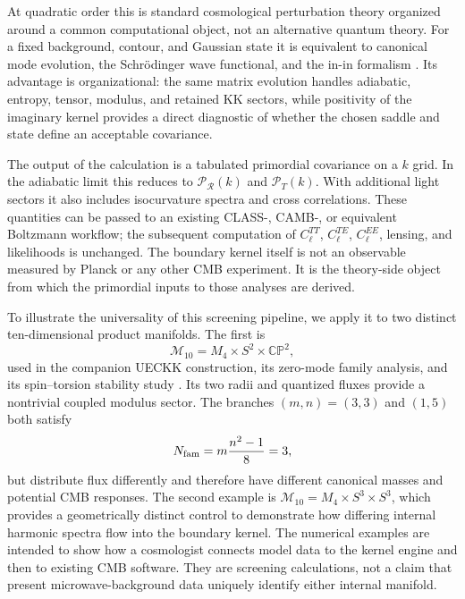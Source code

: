 \documentclass[11pt,a4paper]{article}
\newcommand{\cM}{\mathcal M}
\newcommand{\CP}{\mathbb{CP}}
\begin{document}
At quadratic order this is standard cosmological perturbation theory organized around a common computational object, not an alternative quantum theory.  For a fixed background, contour, and Gaussian state it is equivalent to canonical mode evolution, the Schr\"odinger wave functional, and the in-in formalism \cite{HalliwellHawking1985,PolarskiStarobinsky1996,Maldacena2003}.  Its advantage is organizational: the same matrix evolution handles adiabatic, entropy, tensor, modulus, and retained KK sectors, while positivity of the imaginary kernel provides a direct diagnostic of whether the chosen saddle and state define an acceptable covariance.

The output of the calculation is a tabulated primordial covariance on a $k$ grid.  In the adiabatic limit this reduces to $\mathcal P_{\mathcal R}(k)$ and $\mathcal P_T(k)$.  With additional light sectors it also includes isocurvature spectra and cross correlations.  These quantities can be passed to an existing CLASS-, CAMB-, or equivalent Boltzmann workflow; the subsequent computation of $C_\ell^{TT}$, $C_\ell^{TE}$, $C_\ell^{EE}$, lensing, and likelihoods is unchanged.  The boundary kernel itself is not an observable measured by Planck or any other CMB experiment.  It is the theory-side object from which the primordial inputs to those analyses are derived.

To illustrate the universality of this screening pipeline, we apply it to two distinct ten-dimensional product manifolds. The first is
\begin{equation}
\cM_{10}=M_4\times S^2\times\CP^2,
\end{equation}
used in the companion UECKK construction, its zero-mode family analysis, and its spin--torsion stability study \cite{ShayaUECKK2026,ShayaZeroModes2026,ShayaVacuum2026}. Its two radii and quantized fluxes provide a nontrivial coupled modulus sector. The branches $(m,n)=(3,3)$ and $(1,5)$ both satisfy
\begin{equation}
N_{\rm fam}=m\frac{n^2-1}{8}=3,
\end{equation}
but distribute flux differently and therefore have different canonical masses and potential CMB responses. The second example is $\cM_{10}=M_4\times S^3\times S^3$, which provides a geometrically distinct control to demonstrate how differing internal harmonic spectra flow into the boundary kernel. The numerical examples are intended to show how a cosmologist connects model data to the kernel engine and then to existing CMB software. They are screening calculations, not a claim that present microwave-background data uniquely identify either internal manifold.
\end{document}

